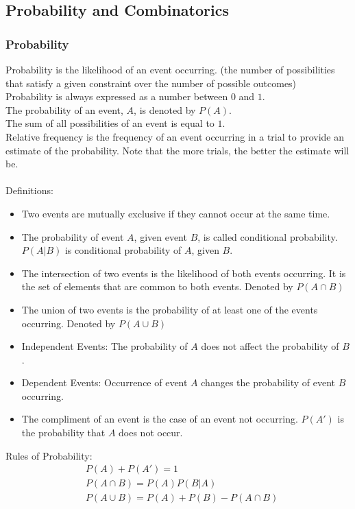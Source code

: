 \subsection{Probability and Combinatorics}

\subsubsection{Probability}
Probability is the likelihood of an event occurring. (the number of possibilities that satisfy a given constraint over the number of possible outcomes)\\
Probability is always expressed as a number between $0$ and $1$.\\
The probability of an event, $A$, is denoted by $P(A)$.\\
The sum of all possibilities of an event is equal to $1$.\\
Relative frequency is the frequency of an event occurring in a trial to provide an estimate of the probability. Note that the more trials, the better the estimate will be.\\
\\
Definitions:
\begin{itemize}
    \item Two events are mutually exclusive if they cannot occur at the same time.
    \item The probability of event $A$, given event $B$, is called conditional probability. $P(A|B)$ is conditional probability of $A$, given $B$.
    \item The intersection of two events is the likelihood of both events occurring. It is the set of elements that are common to both events. Denoted by $P(A\cap B)$
    \item The union of two events is the probability of at least one of the events occurring. Denoted by $P(A\cup B)$
    \item Independent Events: The probability of $A$ does not affect the probability of $B$.
    \item Dependent Events: Occurrence of event $A$ changes the probability of event $B$ occurring.
    \item The compliment of an event is the case of an event not occurring. $P(A')$ is the probability that $A$ does not occur.
\end{itemize}
Rules of Probability:
\begin{align*}
    &P(A)+P(A')=1\\
    &P(A\cap B)=P(A)P(B|A)\\
    &P(A\cup B)=P(A)+P(B)-P(A\cap B)
\end{align*}

